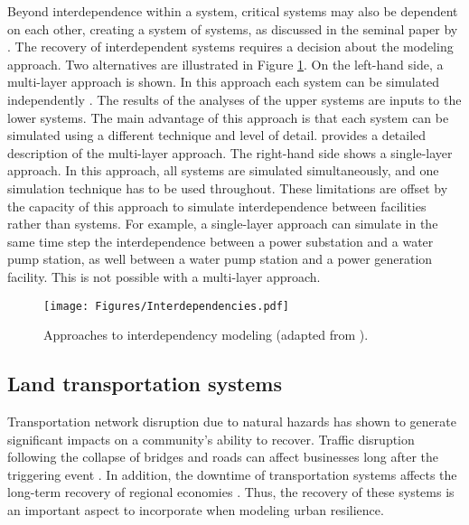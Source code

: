 Beyond interdependence within a system, critical systems may also be dependent on each other, creating a system of systems, as discussed in the seminal paper by \citet{rinaldi2001identifying}. The recovery of interdependent systems requires a decision about the modeling approach. Two alternatives are illustrated in Figure \ref{fig:Interdependencies}. On the left-hand side, a multi-layer approach is shown. In this approach each system can be simulated independently \citep{guidotti2017multi}. The results of the analyses of the upper systems are inputs to the lower systems. The main advantage of this approach is that each system can be simulated using a different technique and level of detail. \cite[p.243]{cimellaro2016resilience} provides a detailed description of the multi-layer approach. The right-hand side shows a single-layer approach. In this approach, all systems are simulated simultaneously, and one simulation technique has to be used throughout. These limitations are offset by the capacity of this approach to simulate interdependence between facilities rather than systems. For example, a single-layer approach can simulate in the same time step the interdependence between a power substation and a water pump station, as well between a water pump station and a power generation facility. This is not possible with a multi-layer approach.\ 

\begin{figure}[htb]
    \centering
    \texttt{[image: Figures/Interdependencies.pdf]}
    \caption{Approaches to interdependency modeling (adapted from \citet{cimellaro2016resilience}).}
    \label{fig:Interdependencies}
\end{figure}

\subsection{Land transportation systems}
Transportation network disruption due to natural hazards has shown to generate significant impacts on a community's ability to recover. Traffic disruption following the collapse of bridges and roads can affect businesses long after the triggering event \citep{boarnet1998business}. In addition, the downtime of transportation systems affects the long-term recovery of regional economies \citep{chang2000transportation}. Thus, the recovery of these systems is an important aspect to incorporate when modeling urban resilience. \

